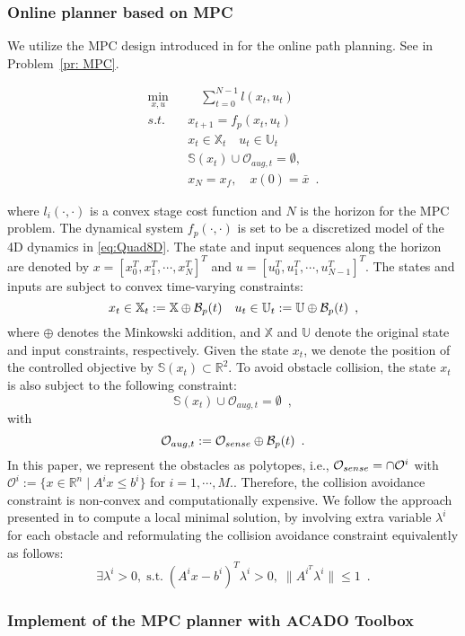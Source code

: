 \subsubsection{Online planner based on MPC}
%
We utilize the MPC design introduced in \cite{zhang_2017_MPC} for the online path planning. See in Problem~\ref{pr: MPC}.
%
\begin{problem}\label{pr: MPC}
\begin{align*}
\min_{x,u}  & \quad \sum^{N-1}_{t=0} l(x_t,u_t)  \\
s.t. \quad &x_{t+1} = f_p(x_t,u_t)\\
& x_t \in \mathbb{X}_t\quad u_t \in \mathbb{U}_t\\
& \mathbb{S}(x_t)\cup\mathcal{O}_{aug,t} = \emptyset,\\
& x_N = x_f ,\quad x(0) = \bar{x} \enspace.
\end{align*}
\end{problem}
\noindent where $l_i(\cdot,\cdot)$ is a  convex stage cost function and $N$ is the horizon for the MPC problem. The dynamical system $f_p(\cdot,\cdot)$ is set to be a discretized model of the 4D dynamics in \ref{eq:Quad8D}. The state and input sequences along the horizon  are denoted by $x=[x^{T}_0,x^{T}_1,\cdots,x^{T}_N]^{T}$ and $u=[u^{T}_0,u^{T}_1,\cdots,u^{T}_{N-1}]^{T}$. The states and inputs are subject to convex time-varying constraints:
%
\begin{equation}
x_t \in \mathbb{X}_t :=\mathbb{X}\oplus\mathcal B_p(t) \quad u_t \in\mathbb{U}_t := \mathbb{U}\oplus\mathcal B_p(t)  \enspace ,
\end{equation}
%
where $\oplus$ denotes the Minkowski addition, and $\mathbb{X}$ and $\mathbb{U}$ denote the original state and input constraints, respectively. Given the state $x_t$, we denote the position of the controlled objective by $\mathbb{S}(x_t)\subset \mathbb{R}^{2}$. To avoid obstacle collision, the state $x_t$ is also subject to the following constraint: 
%
\begin{equation}
\mathbb{S}(x_t)\cup\mathcal{O}_{aug,t} = \emptyset \enspace ,
\end{equation}
%
with 
%
\begin{equation}
\mathcal{O}_{aug,t} := \mathcal{O}_{sense}\oplus\mathcal B_p(t) \enspace .
\end{equation}
%
In this paper, we represent the obstacles as polytopes, i.e., $\mathcal{O}_{sense} = \cap \mathcal{O}^{i}$ with $\mathcal{O}^{i}:= \{x\in\mathbb{R}^{n} \mid A^{i}x\leq b^{i}\}$ for $i = 1,\cdots ,M.$. Therefore, the collision avoidance constraint is non-convex and computationally expensive. We follow the approach presented in \cite{zhang_2017_MPC} to compute a local minimal solution, by involving extra variable $\lambda^{i}$ for each obstacle and reformulating the collision avoidance constraint equivalently as follows: 
%
\begin{equation}
\exists \lambda^{i} >0, \; \mbox{s.t.} \; (A^{i}x- b^{i})^{T}\lambda^{i}  > 0, \; \|A^{i^{T}}\lambda^{i}\|\leq 1\enspace .
\end{equation}
%
\subsubsection{Implement of the MPC planner with ACADO Toolbox}
 